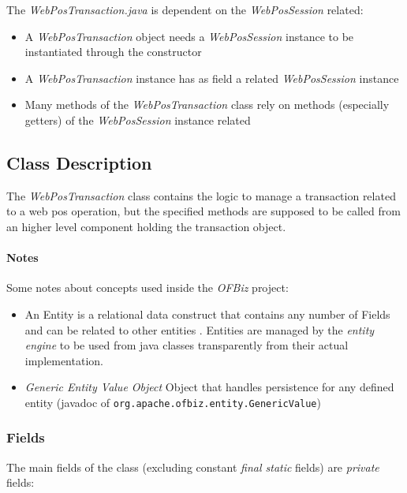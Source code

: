 The \emph{WebPosTransaction.java} is dependent on the \emph{WebPosSession} related:
\begin{itemize}
	\item A \emph{WebPosTransaction} object needs a \emph{WebPosSession} instance to be instantiated through the constructor
	\item A \emph{WebPosTransaction} instance has as field a related \emph{WebPosSession} instance
	\item Many methods of the \emph{WebPosTransaction} class rely on methods (especially getters) of the \emph{WebPosSession} instance related
\end{itemize}

\clearpage

\subsection{Class Description}
The \emph{WebPosTransaction} class contains the logic to manage a transaction related to a web pos operation, but the specified methods are supposed to be called from an higher level component holding the transaction object.

\paragraph{Notes} Some notes about concepts used inside the \emph{OFBiz} project:
\begin{itemize}
 	\item An Entity is a relational data construct that contains any number of Fields and can be related to other entities \cite{OFBiz}. Entities are managed by the \emph{entity engine} to be used from java classes transparently from their actual implementation.
 	\item \emph{Generic Entity Value Object} Object that handles persistence for any defined entity (javadoc of \texttt{org.apache.ofbiz.entity.GenericValue})
\end{itemize}

\subsubsection{Fields}
The main fields of the class (excluding constant \emph{final static} fields)  are \emph{private} fields:

